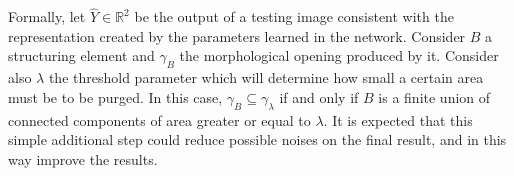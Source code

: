 Formally, let $\hat{Y}\in \mathbb{R}^2$ be the output of a testing image consistent with the representation created by the parameters learned in the network. Consider $B$ a structuring element and $\gamma_B$ the morphological opening produced by it. Consider also $\lambda$ the threshold parameter which will determine how small a certain area must be to be purged. In this case,  $\gamma_B \subseteq \gamma_\lambda$ if and only if $B$ is a finite union of connected components of area greater or equal to $\lambda$. It is expected that this simple additional step could reduce possible noises on the final result, and in this way improve the results.

 












